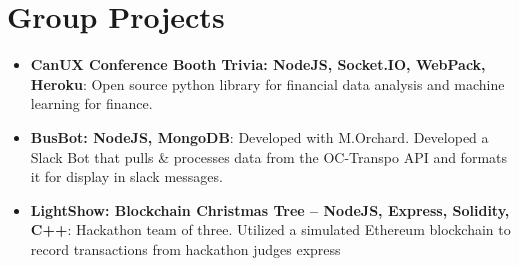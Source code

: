 \documentclass[letterpaper,11pt]{article}
\newcommand{\resumeItem}[2]{
  \item\small{
    \textbf{#1}{: #2 \vspace{-2pt}}
  }
}
\newcommand{\resumeSubItem}[2]{\resumeItem{#1}{#2}\vspace{-4pt}}
\newcommand{\resumeSubHeadingListStart}{\begin{itemize}[leftmargin=*]}
\newcommand{\resumeSubHeadingListEnd}{\end{itemize}}
\begin{document}
\section{Group Projects}
  \resumeSubHeadingListStart
    \resumeSubItem{CanUX Conference Booth Trivia: NodeJS, Socket.IO, WebPack, Heroku}
      {Open source python library for financial data analysis and machine learning for finance.}
    \resumeSubItem{BusBot: NodeJS, MongoDB}
      {Developed with M.Orchard. Developed a Slack Bot that pulls \& processes data from the OC-Transpo API and formats it for display in slack messages.}
       \resumeSubItem{LightShow: Blockchain Christmas Tree -- NodeJS, Express, Solidity, C++}
      {Hackathon team of three. Utilized a simulated Ethereum blockchain to record transactions from hackathon judges express}
  \resumeSubHeadingListEnd

%


\end{document}
